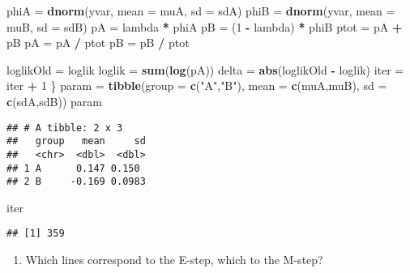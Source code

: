 \documentclass[]{article}
\newenvironment{Shaded}{\begin{snugshade}}{\end{snugshade}}
\newcommand{\DataTypeTok}[1]{\textcolor[rgb]{0.13,0.29,0.53}{#1}}
\newcommand{\DecValTok}[1]{\textcolor[rgb]{0.00,0.00,0.81}{#1}}
\newcommand{\KeywordTok}[1]{\textcolor[rgb]{0.13,0.29,0.53}{\textbf{#1}}}
\newcommand{\NormalTok}[1]{#1}
\newcommand{\OperatorTok}[1]{\textcolor[rgb]{0.81,0.36,0.00}{\textbf{#1}}}
\newcommand{\StringTok}[1]{\textcolor[rgb]{0.31,0.60,0.02}{#1}}
\providecommand{\tightlist}{%
  \setlength{\itemsep}{0pt}\setlength{\parskip}{0pt}}
\begin{document}
\begin{Shaded}
\begin{Highlighting}[]
\NormalTok{  phiA =}\StringTok{ }\KeywordTok{dnorm}\NormalTok{(yvar, }\DataTypeTok{mean =}\NormalTok{ muA, }\DataTypeTok{sd =}\NormalTok{ sdA)}
\NormalTok{  phiB =}\StringTok{ }\KeywordTok{dnorm}\NormalTok{(yvar, }\DataTypeTok{mean =}\NormalTok{ muB, }\DataTypeTok{sd =}\NormalTok{ sdB)}
\NormalTok{  pA   =}\StringTok{ }\NormalTok{lambda }\OperatorTok{*}\StringTok{ }\NormalTok{phiA}
\NormalTok{  pB   =}\StringTok{ }\NormalTok{(}\DecValTok{1} \OperatorTok{-}\StringTok{ }\NormalTok{lambda) }\OperatorTok{*}\StringTok{ }\NormalTok{phiB}
\NormalTok{  ptot =}\StringTok{ }\NormalTok{pA }\OperatorTok{+}\StringTok{ }\NormalTok{pB}
\NormalTok{  pA   =}\StringTok{ }\NormalTok{pA }\OperatorTok{/}\StringTok{ }\NormalTok{ptot}
\NormalTok{  pB   =}\StringTok{ }\NormalTok{pB }\OperatorTok{/}\StringTok{ }\NormalTok{ptot}

\NormalTok{  loglikOld =}\StringTok{ }\NormalTok{loglik}
\NormalTok{  loglik =}\StringTok{ }\KeywordTok{sum}\NormalTok{(}\KeywordTok{log}\NormalTok{(pA))}
\NormalTok{  delta =}\StringTok{ }\KeywordTok{abs}\NormalTok{(loglikOld }\OperatorTok{-}\StringTok{ }\NormalTok{loglik)}
\NormalTok{  iter =}\StringTok{ }\NormalTok{iter }\OperatorTok{+}\StringTok{ }\DecValTok{1}
\NormalTok{\}}
\NormalTok{param =}\StringTok{ }\KeywordTok{tibble}\NormalTok{(}\DataTypeTok{group =} \KeywordTok{c}\NormalTok{(}\StringTok{"A"}\NormalTok{,}\StringTok{"B"}\NormalTok{), }\DataTypeTok{mean =} \KeywordTok{c}\NormalTok{(muA,muB), }\DataTypeTok{sd =} \KeywordTok{c}\NormalTok{(sdA,sdB))}
\NormalTok{param}
\end{Highlighting}
\end{Shaded}

\begin{verbatim}
## # A tibble: 2 x 3
##   group   mean     sd
##   <chr>  <dbl>  <dbl>
## 1 A      0.147 0.150 
## 2 B     -0.169 0.0983
\end{verbatim}

\begin{Shaded}
\begin{Highlighting}[]
\NormalTok{iter}
\end{Highlighting}
\end{Shaded}

\begin{verbatim}
## [1] 359
\end{verbatim}

\begin{enumerate}
\def\labelenumi{\alph{enumi}.}
\tightlist
\item
  Which lines correspond to the E-step, which to the M-step?
\end{enumerate}
\end{document}
